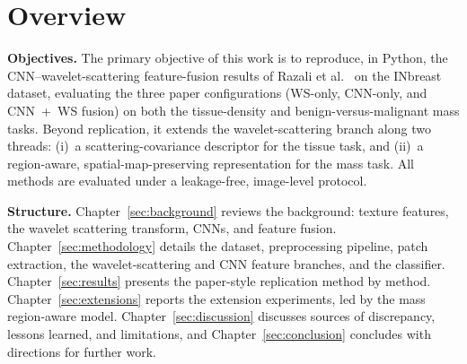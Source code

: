 \section{Overview}

\textbf{Objectives.} The primary objective of this work is to reproduce, in Python, the CNN--wavelet-scattering feature-fusion results of Razali et al.~\cite{razali2023cnn} on the INbreast dataset, evaluating the three paper configurations (WS-only, CNN-only, and CNN~+~WS fusion) on both the tissue-density and benign-versus-malignant mass tasks. Beyond replication, it extends the wavelet-scattering branch along two threads: (i)~a scattering-covariance descriptor for the tissue task, and (ii)~a region-aware, spatial-map-preserving representation for the mass task. All methods are evaluated under a leakage-free, image-level protocol.

\textbf{Structure.} Chapter~\ref{sec:background} reviews the background: texture features, the wavelet scattering transform, CNNs, and feature fusion. Chapter~\ref{sec:methodology} details the dataset, preprocessing pipeline, patch extraction, the wavelet-scattering and CNN feature branches, and the classifier. Chapter~\ref{sec:results} presents the paper-style replication method by method. Chapter~\ref{sec:extensions} reports the extension experiments, led by the mass region-aware model. Chapter~\ref{sec:discussion} discusses sources of discrepancy, lessons learned, and limitations, and Chapter~\ref{sec:conclusion} concludes with directions for further work.


